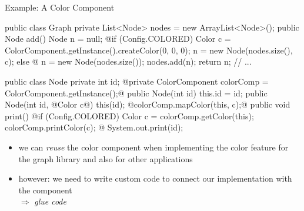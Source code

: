 \begin{frame}[fragile]{Example: A Color Component}
	\begin{mycolumns}[b,widths={60},animation=none]
\begin{codetight}{}
public class Graph {
	private List<Node> nodes = new ArrayList<Node>();
	public Node add() {
		Node n = null;
		@if (Config.COLORED) {
			Color c = ColorComponent.getInstance().createColor(0, 0, 0);
			n = new Node(nodes.size(), c);
		} else @ {
			n = new Node(nodes.size());
		}
		nodes.add(n);
		return n;
	}
	// ...
}
\end{codetight}
		\mynextcolumn
		\vspace{-10mm}
\begin{codetight}{}
public class Node {
	private int id;
	@private ColorComponent colorComp =
		ColorComponent.getInstance();@
	public Node(int id) { this.id = id; }
	public Node(int id, @Color c@) {
		this(id);
		@colorComp.mapColor(this, c);@
	}
	public void print() {
		@if (Config.COLORED) {
			Color c = colorComp.getColor(this);
			colorComp.printColor(c);
		}@
		System.out.print(id);
	}
}
\end{codetight}
	\end{mycolumns}
	\begin{note}{}
		\begin{itemize}
			\item we can \emph{reuse} the color component when implementing the color feature for the graph library and also for other applications
			\item however: we need to write custom code to connect our implementation with the component\\
				$\Rightarrow$ \emph{glue code}
		\end{itemize}
	\end{note}
\end{frame}

